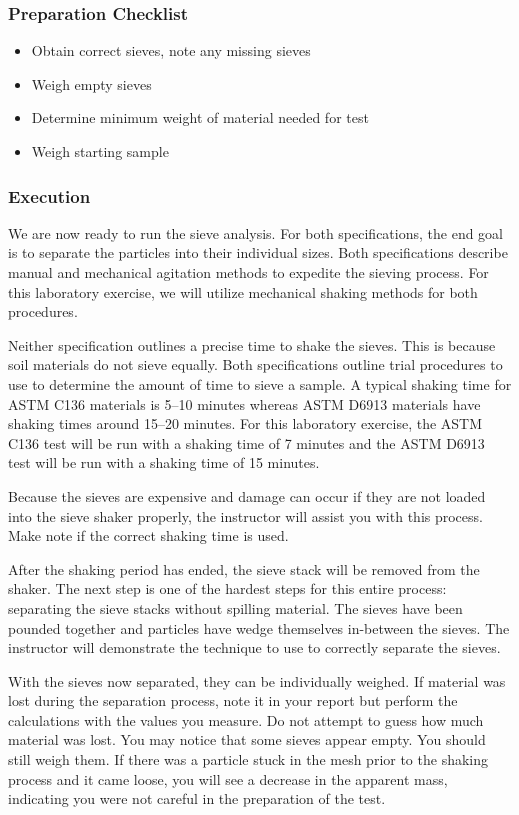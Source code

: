 \documentclass[12pt]{article}
\begin{document}
\subsubsection*{Preparation Checklist}
\begin{itemize}
    \item Obtain correct sieves, note any missing sieves
    \item Weigh empty sieves
    \item Determine minimum weight of material needed for test
    \item Weigh starting sample
\end{itemize}

\subsubsection{Execution}
We are now ready to run the sieve analysis. For both specifications, the end goal is to separate the particles into their individual sizes. Both specifications describe manual and mechanical agitation methods to expedite the sieving process. For this laboratory exercise, we will utilize mechanical shaking methods for both procedures.

Neither specification outlines a precise time to shake the sieves. This is because soil materials do not sieve equally. Both specifications outline trial procedures to use to determine the amount of time to sieve a sample. A typical shaking time for ASTM C136 materials is 5--10 minutes whereas ASTM D6913 materials have shaking times around 15--20 minutes. For this laboratory exercise, the ASTM C136 test will be run with a shaking time of 7 minutes and the ASTM D6913 test will be run with a shaking time of 15 minutes.

Because the sieves are expensive and damage can occur if they are not loaded into the sieve shaker properly, the instructor will assist you with this process. Make note if the correct shaking time is used.

After the shaking period has ended, the sieve stack will be removed from the shaker. The next step is one of the hardest steps for this entire process: separating the sieve stacks without spilling material. The sieves have been pounded together and particles have wedge themselves in-between the sieves. The instructor will demonstrate the technique to use to correctly separate the sieves.

With the sieves now separated, they can be individually weighed. If material was lost during the separation process, note it in your report but perform the calculations with the values you measure. Do not attempt to guess how much material was lost. You may notice that some sieves appear empty. You should still weigh them. If there was a particle stuck in the mesh prior to the shaking process and it came loose, you will see a decrease in the apparent mass, indicating you were not careful in the preparation of the test.
\end{document}
